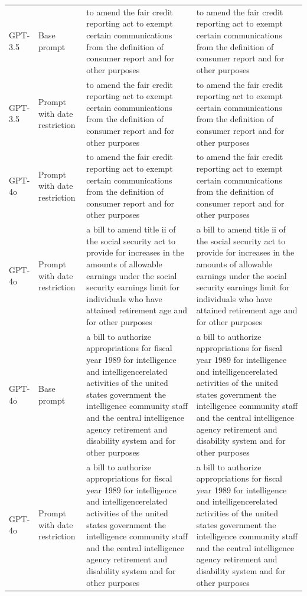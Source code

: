 \begin{longtable}{>{\raggedright\arraybackslash}p{1.4cm}>{\raggedright\arraybackslash}p{1.4cm}>{\raggedright\arraybackslash}p{5.5cm}>{\raggedright\arraybackslash}p{5.5cm}}
GPT-3.5 & Base prompt & to amend the fair credit reporting act to exempt certain communications from the definition of consumer report and for other purposes & to amend the fair credit reporting act to exempt certain communications from the definition of consumer report and for other purposes\\
GPT-3.5 & Prompt with date restriction & to amend the fair credit reporting act to exempt certain communications from the definition of consumer report and for other purposes & to amend the fair credit reporting act to exempt certain communications from the definition of consumer report and for other purposes\\
GPT-4o & Prompt with date restriction & to amend the fair credit reporting act to exempt certain communications from the definition of consumer report and for other purposes & to amend the fair credit reporting act to exempt certain communications from the definition of consumer report and for other purposes\\
GPT-4o & Prompt with date restriction & a bill to amend title ii of the social security act to provide for increases in the amounts of allowable earnings under the social security earnings limit for individuals who have attained retirement age and for other purposes & a bill to amend title ii of the social security act to provide for increases in the amounts of allowable earnings under the social security earnings limit for individuals who have attained retirement age and for other purposes\\
GPT-4o & Base prompt & a bill to authorize appropriations for fiscal year 1989 for intelligence and intelligencerelated activities of the united states government the intelligence community staff and the central intelligence agency retirement and disability system and for other purposes & a bill to authorize appropriations for fiscal year 1989 for intelligence and intelligencerelated activities of the united states government the intelligence community staff and the central intelligence agency retirement and disability system and for other purposes\\
GPT-4o & Prompt with date restriction & a bill to authorize appropriations for fiscal year 1989 for intelligence and intelligencerelated activities of the united states government the intelligence community staff and the central intelligence agency retirement and disability system and for other purposes & a bill to authorize appropriations for fiscal year 1989 for intelligence and intelligencerelated activities of the united states government the intelligence community staff and the central intelligence agency retirement and disability system and for other purposes\\

\end{longtable}
